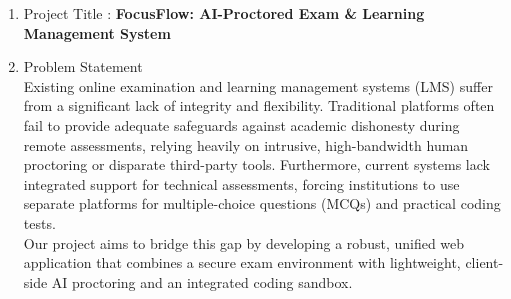 \documentclass[14pt]{article}
\begin{document}
\begin{enumerate}
\item Project Title : \textbf{FocusFlow: AI-Proctored Exam \& Learning Management System}
\item Problem Statement \\
\tabto{.5cm}Existing online examination and learning management systems (LMS) suffer from a significant lack of integrity and flexibility. Traditional platforms often fail to provide adequate safeguards against academic dishonesty during remote assessments, relying heavily on intrusive, high-bandwidth human proctoring or disparate third-party tools. Furthermore, current systems lack integrated support for technical assessments, forcing institutions to use separate platforms for multiple-choice questions (MCQs) and practical coding tests. \\
\tabto{.5cm} Our project aims to bridge this gap by developing a robust, unified web application that combines a secure exam environment with lightweight, client-side AI proctoring and an integrated coding sandbox.


\end{enumerate}
\end{document}
